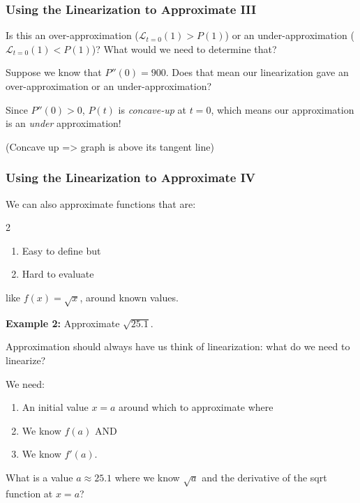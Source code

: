 \documentclass{ltx-talk}
\begin{document}
\begin{frame}
  \frametitle{Using the Linearization to Approximate III}

  Is this an over-approximation ($\mathscr{L}_{t = 0}(1) > P(1)$) or an under-approximation ($\mathscr{L}_{t = 0}(1) < P(1)$)? What would we need to determine that? \pause

  Suppose we know that $P''(0) = 900$. Does that mean our linearization gave an over-approximation or an under-approximation? \pause

  Since $P''(0) > 0$, $P(t)$ is \pause \textit{concave-up} at $t = 0$,
  which means our approximation is an \textit{under} approximation! \pause

  (Concave up => graph is above its tangent line)
\end{frame}

\begin{frame}
  \frametitle{Using the Linearization to Approximate IV}

  We can also approximate functions that are:
  \begin{multicols}{2}
    \begin{enumerate}
      \item Easy to define but \pause
      \item Hard to evaluate
    \end{enumerate}
  \end{multicols}
  like $f(x) = \sqrt{x}$, around known values. \pause

  \textbf{Example 2:} Approximate $\sqrt{25.1}$. \pause

  Approximation should always have us think of linearization: what do we need to linearize? \pause

  We need:
  \begin{enumerate}
    \item An initial value $x = a$ around which to approximate where \pause
    \item We know $f(a)$ AND \pause
    \item We know $f'(a)$. \pause
  \end{enumerate}

  What is a value $a \approx 25.1$ where we know $\sqrt{a}$ and the derivative of the sqrt function at $x = a$?
\end{frame}
\end{document}
